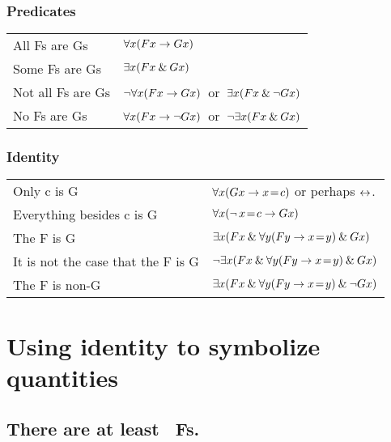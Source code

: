 \subsubsection*{Predicates}
\begin{center}
\begin{tabular*}{\textwidth}{ll}\label{SymbolizingPredicates}
All Fs are Gs & $\forall x(Fx \rightarrow Gx)$\\
Some Fs are Gs & $\exists x(Fx \mathbin{\&} Gx)$\\
Not all Fs are Gs & $\neg\forall x(Fx \rightarrow Gx)$\ or\ $\exists x(Fx \mathbin{\&} \neg Gx)$\\
No Fs are Gs & $\forall x(Fx \rightarrow\neg Gx)$\ or\ $\neg\exists x(Fx \mathbin{\&} Gx)$\\
\end{tabular*}
\end{center}
\subsubsection*{Identity}
\begin{center}
\begin{tabular*}{\textwidth}{ll}
Only c is G & $\forall x(Gx \rightarrow x\!=\! c)$ or perhaps $\leftrightarrow$.  \\
Everything besides c is G & $\forall x(\neg \,x \!=\!  c \rightarrow Gx)$\\
The F is G & $\exists x(Fx \mathbin{\&} \forall y(Fy \rightarrow x\!=\! y) \mathbin{\&} Gx)$\\
It is not the case that the F is G & $\neg\exists x(Fx \mathbin{\&} \forall y(Fy \rightarrow x\!=\! y) \mathbin{\&} Gx)$\\
The F is non-G & $\exists x(Fx \mathbin{\&} \forall y(Fy \rightarrow x\!=\! y) \mathbin{\&} \neg Gx)$
\end{tabular*}
\end{center}







\newpage
\section{Using identity to symbolize quantities}

\subsection*{There are at least \blank\ Fs.}
\label{summary.atleast}

